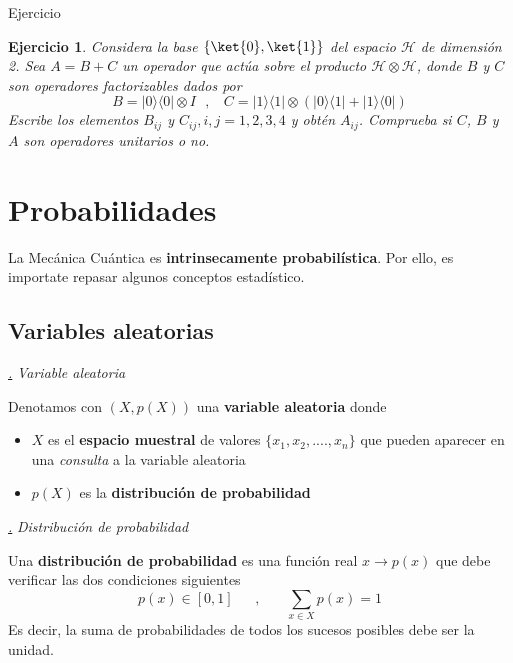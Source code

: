\documentclass[a4paper,11pt]{book} %
\newtheorem{ejercicio_contador}{Ejercicio}
\newcommand{\Ejercicio}[1]{
		\begin{mybox_gray}{Ejercicio} 
			\begin{ejercicio_contador}
				 #1 
			\end{ejercicio_contador} 
		\end{mybox_gray}
	}
\numberwithin{equation}{chapter}
\newcommand{\ketbra}[2]{| #1\rangle \! \langle #2|}
\def\subsubiContadorIt{\par\addtocounter{subsubsection}{1}\underline{\it\thesubsubsection.}\hskip0.5cm \setcounter{subsubsubsectionIt}{0}}
\newcommand{\SubsubiIt}[1]{
		\subsubiContadorIt \textit{#1}
	}
\newcounter{subsubsubsectionIt}[subsubsection]
\begin{document}
		
	\Ejercicio{
	 Considera la base $\{\ket{0},\ket{1} \}$ del espacio $\mathcal{H}$ de dimensión 2. Sea $A= B + C$ un operador que actúa sobre el producto $\mathcal{H}\otimes \mathcal{H}$,  donde $B$ y $C$ son operadores factorizables dados por  
$$
B = \ketbra{0}{0}\otimes I ~~~, ~~~~ 
C = \ketbra{1}{1}\otimes (\ketbra{0}{1} + \ketbra{1}{0})
$$ 
Escribe los elementos $B_{ij}$ y $C_{ij}, i,j=1,2,3,4$  y obtén $A_{ij}$. Comprueba si $C$, $B$ y $A$ son operadores unitarios o no.
	}


	
	\section{Probabilidades}

La Mecánica Cuántica es \textbf{intrinsecamente probabilística}. Por ello, es importate repasar algunos conceptos estadístico.

		\subsection{Variables aleatorias}

			\SubsubiIt{Variable aleatoria}
		
	\begin{mybox_gray2}{}
	Denotamos con $(X,p(X))$ una  \textbf{variable aleatoria} donde
\begin{itemize}
	\item $X$ es el \textbf{espacio muestral} de valores $\{x_1, x_2,....,x_n\}$ que pueden aparecer en una \textit{consulta} a la variable aleatoria
	
	\item $p(X)$ es la \textbf{distribución de probabilidad}
\end{itemize}
	\end{mybox_gray2}


	
			\SubsubiIt{Distribución de probabilidad}

	\begin{mybox_gray2}{}
Una \textbf{distribución de probabilidad} es una función real $x\to p(x)$ que debe  verificar las dos condiciones siguientes
	\begin{equation}
	p(x) \in [0,1]~~~~~~~,~~~~~~~~\sum_{x\in X }p(x) = 1 
	\end{equation}
Es decir, la suma de probabilidades de todos los sucesos posibles debe ser la unidad.
	\end{mybox_gray2}
\end{document}
